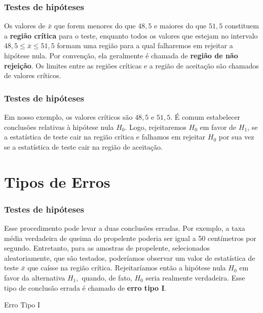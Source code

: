 \documentclass[14pt,aspectratio=1610]{beamer}
\begin{document}
\begin{frame}{}
\frametitle{Testes de hipóteses}
\begin{block}{}
\justifying
Os valores de $\bar{x}$ que forem menores do que $48,5$ e maiores do que $51,5$ constituem a \textbf{região crítica} para o teste, enquanto todos os valores que estejam 
no intervalo $48,5 \leq \bar{x}\leq 51,5$ formam uma região para a qual falharemos em rejeitar a hipótese nula. Por convenção, ela geralmente é chamada de 
\textbf{região de não rejeição}. Os limites entre as regiões críticas e a região de aceitação são chamados de valores críticos. 
 \end{block}
\end{frame}

\begin{frame}{}
\frametitle{Testes de hipóteses}
\begin{block}{}
\justifying
Em nosso exemplo, os valores críticos são $48,5$ e $51,5.$ É comum estabelecer conclusões relativas à hipótese nula $H_{0}.$ Logo, rejeitaremos $H_{0}$ em favor 
de $H_{1}$, se a estatística de teste cair na região crítica e falhamos em rejeitar $H_{0}$ por sua vez se a estatística de teste cair na região de aceitação.
 \end{block}
\end{frame}

\section{Tipos de Erros}
\begin{frame}{}
\frametitle{Testes de hipóteses}
\begin{block}{}
\justifying
Esse procedimento pode levar a duas conclusões erradas. Por exemplo, a taxa média verdadeira de queima do propelente poderia ser igual a 50 centímetros por segundo. 
Entretanto, para as amostras de propelente, selecionados aleatoriamente, que são testados, poderíamos observar um valor de estatística de teste $\bar{x}$ que 
caísse na região crítica. Rejeitaríamos então a hipótese nula $H_{0}$ em favor da alternativa $H_{1},$ quando, de fato, $H_{0}$ seria realmente verdadeira. Esse tipo de 
conclusão errada é chamado de \textbf{erro tipo I}.
 \end{block}
\pause
\begin{block}{Erro Tipo I}

\end{block}
\end{frame}
\end{document}

